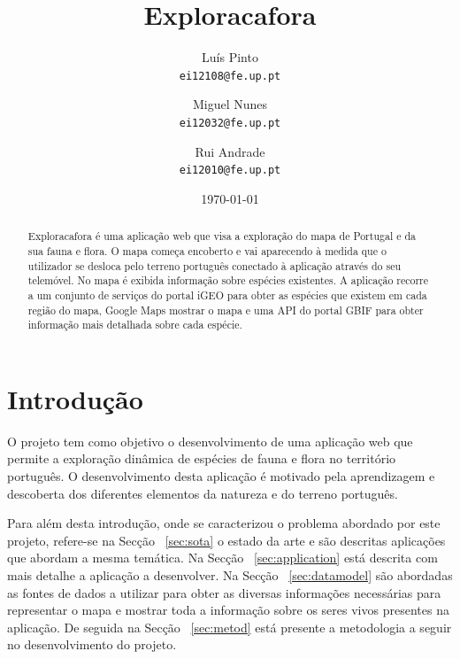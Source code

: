 \documentclass[twocolumn,twoside,11pt,a4paper]{article}
\title{\vspace{-15mm}\fontsize{24pt}{10pt}\selectfont\textbf{Exploracafora}} %
\author{Luís Pinto\\
\small \texttt{ei12108@fe.up.pt}\\
\and
Miguel Nunes\\
\small \texttt{ei12032@fe.up.pt}\\
\and
Rui Andrade\\
\small \texttt{ei12010@fe.up.pt}
\vspace{-5mm}
}
\date{\today}
\begin{document}
\maketitle
\thispagestyle{plain}            %


\begin{abstract}
Exploracafora é uma aplicação web que visa a exploração do mapa de Portugal e da sua fauna e flora. O mapa começa encoberto e vai aparecendo à medida que o utilizador se desloca pelo terreno português conectado à aplicação através do seu telemóvel. No mapa é exibida informação sobre espécies existentes. A aplicação recorre a um conjunto de serviços do portal iGEO para obter as espécies que existem em cada região do mapa, Google Maps mostrar o mapa e uma API do portal GBIF para obter informação mais detalhada sobre cada espécie.
\end{abstract}


\section{Introdução}\label{sec:intro}

O projeto tem como objetivo o desenvolvimento de uma aplicação web que permite a exploração dinâmica de espécies de fauna e flora no território português. O desenvolvimento desta aplicação é motivado pela aprendizagem e descoberta dos diferentes elementos da natureza e do terreno português.

Para além desta introdução, onde se caracterizou o problema abordado por este projeto, refere-se na Secção ~\ref{sec:sota} o estado da arte e são descritas aplicações que abordam a mesma temática. Na Secção ~\ref{sec:application} está descrita com mais detalhe a aplicação a desenvolver. Na Secção ~\ref{sec:datamodel} são abordadas as fontes de dados a utilizar para obter as diversas informações necessárias para representar o mapa e mostrar toda a informação sobre os seres vivos presentes na aplicação. De seguida na Secção ~\ref{sec:metod} está presente a metodologia a seguir no desenvolvimento do projeto.
\end{document}
